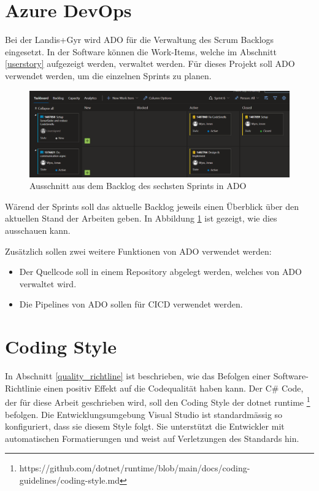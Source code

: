 \section{Azure DevOps}\label{methoden:ADO}
Bei der Landis+Gyr wird \ac{ADO} für die Verwaltung des Scrum Backlogs eingesetzt.
In der Software können die Work-Items, welche im Abschnitt \ref{userstory} aufgezeigt werden, verwaltet werden.
Für dieses Projekt soll \ac{ADO} verwendet werden, um die einzelnen Sprints zu planen.
\begin{figure}[H]
   \centering
   \includegraphics[width=1.0\textwidth]{gfx/ado.png}
   \caption{
         Ausschnitt aus dem Backlog des sechsten Sprints in \ac{ADO}
      }
      \label{fig:adosprint6}
\end{figure}
Wärend der Sprints soll das aktuelle Backlog jeweils einen Überblick über den aktuellen Stand der Arbeiten geben.
In Abbildung \ref{fig:adosprint6} ist gezeigt, wie dies ausschauen kann.

Zusätzlich sollen zwei weitere Funktionen von \ac{ADO} verwendet werden:
\begin{itemize}
   \item Der Quellcode soll in einem Repository abgelegt werden, welches von \ac{ADO} verwaltet wird.
   \item Die Pipelines von \ac{ADO} sollen für \ac{CICD} verwendet werden.
\end{itemize}

\section{Coding Style}\label{codingStandard}
In Abschnitt \ref{quality_richtline} ist beschrieben, wie das Befolgen einer Software-Richtlinie einen positiv Effekt auf die Codequalität haben kann.
Der C\# Code, der für diese Arbeit geschrieben wird, soll den Coding Style der dotnet runtime \footnote{https://github.com/dotnet/runtime/blob/main/docs/coding-guidelines/coding-style.md} befolgen.
Die Entwicklungsumgebung Visual Studio ist standardmässig so konfiguriert, dass sie diesem Style folgt.
Sie unterstützt die Entwickler mit automatischen Formatierungen und weist auf Verletzungen des Standards hin.

